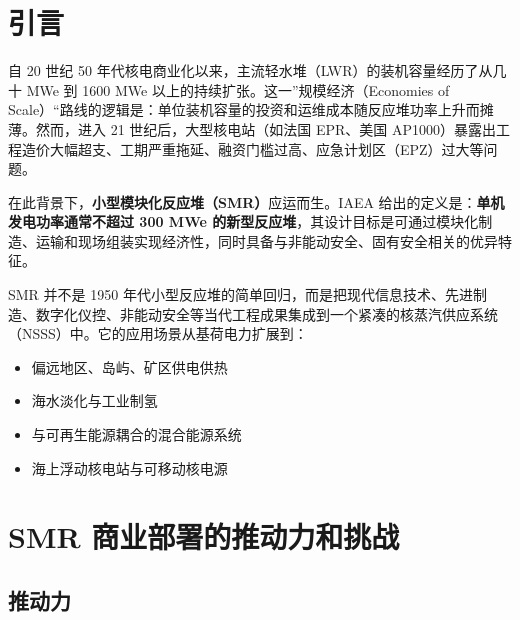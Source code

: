 \documentclass[
  UTF8,
  scheme=plain,
  fontsize=10pt,
  openany
]{ctexbook}
\begin{document}
\section{引言}\label{ux5f15ux8a00}

自 20 世纪 50
年代核电商业化以来，主流轻水堆（LWR）的装机容量经历了从几十 MWe 到 1600
MWe 以上的持续扩张。这一''规模经济（Economies of
Scale）``路线的逻辑是：单位装机容量的投资和运维成本随反应堆功率上升而摊薄。然而，进入
21 世纪后，大型核电站（如法国 EPR、美国
AP1000）暴露出工程造价大幅超支、工期严重拖延、融资门槛过高、应急计划区（EPZ）过大等问题。

在此背景下，\textbf{小型模块化反应堆（SMR）}应运而生。IAEA
给出的定义是：\textbf{单机发电功率通常不超过 300 MWe
的新型反应堆}，其设计目标是可通过模块化制造、运输和现场组装实现经济性，同时具备与非能动安全、固有安全相关的优异特征。

SMR 并不是 1950
年代小型反应堆的简单回归，而是把现代信息技术、先进制造、数字化仪控、非能动安全等当代工程成果集成到一个紧凑的核蒸汽供应系统（NSSS）中。它的应用场景从基荷电力扩展到：

\begin{itemize}
\tightlist
\item
  偏远地区、岛屿、矿区供电供热
\item
  海水淡化与工业制氢
\item
  与可再生能源耦合的混合能源系统
\item
  海上浮动核电站与可移动核电源
\end{itemize}

\section{SMR
商业部署的推动力和挑战}\label{smr-ux5546ux4e1aux90e8ux7f72ux7684ux63a8ux52a8ux529bux548cux6311ux6218}

\subsection{推动力}\label{ux63a8ux52a8ux529b}
\end{document}
